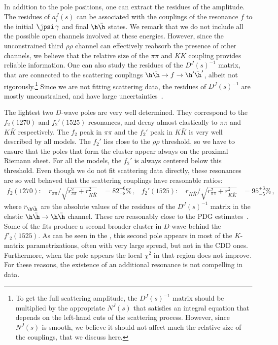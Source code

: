In addition to the pole positions, one can extract the residues of the amplitude. The residues of $a_i^J(s)$ can be associated with the couplings of the resonance $f$ to the initial $\jpsi\,\gamma$ and final $\h \bar \h$ states. We remark that we do not include all the possible open channels involved at these energies. However, since the unconstrained third $\rho\rho$ channel  can effectively reabsorb the presence of other channels, we believe that the relative size of the $\pi\pi$ and $K\bar K$ coupling provides reliable information. One can also study the residues of the $D^J(s)^{-1}$ matrix, that are connected to the scattering couplings $\h \bar \h \to f \to \h' \bar \h'$, albeit not rigorously.\footnote{To get the full scattering amplitude, the  $D^J(s)^{-1}$ matrix should be multiplied by the appropriate $N^J(s)$ that satisfies an integral equation that depends on the left-hand cuts of the scattering process. However, since $N^J(s)$ is smooth, we believe it should not affect much the relative size of the couplings, that we discuss here.} Since we are not fitting scattering data, the residues of $D^J(s)^{-1}$ are mostly unconstrained, and have large uncertainties~\cite{Briceno:2021xlc}.

The lightest two $D$-wave poles are very well determined. They correspond to the $f_2(1270)$ and $f_2'(1525)$ resonances, and decay almost elastically to $\pi \pi$ and $K \bar K$ respectively. The $f_2$ peak in $\pi \pi$ and the $f_2'$ peak in $K \bar K$ is very well described by all models. The $f_2'$ lies close to the $\rho\rho$ threshold, so we have to ensure that the poles that form the cluster appear always on the proximal Riemann sheet. For all the models, the $f_2'$ is always centered below this threshold. 
Even though we do not fit scattering data directly, these resonances are so well behaved that the scattering couplings have reasonable ratios:
\begin{align}
f_2(1270): \quad r_{\pi\pi}\Big/\sqrt{r^2_{\pi\pi} + r^2_{K \bar K}} &=82^{+6}_{-8}\% \,, &
f_2'(1525): \quad r_{K\bar K}\Big/\sqrt{r^2_{\pi\pi} + r^2_{K \bar K}}&=95 ^{+3}_{-5}\% \,,
\end{align}
where $r_{\h\bar \h}$ are the absolute values of the residues of the $D^J(s)^{-1}$ matrix in the elastic $\h\bar \h \to \h\bar \h$ channel. These are reasonably close to the PDG estimates~\cite{pdg}. 
Some of the fits produce a second broader cluster in  $D$-wave behind the $f'_2(1525)$. As can be seen in the , this second pole appears in most of the $K$-matrix parametrizations, often with very large spread, but not in the CDD ones. 
Furthermore, when the pole appears the local $\chi^2$ in that region does not improve. For these reasons, the existence of an additional resonance is not compelling in data.

